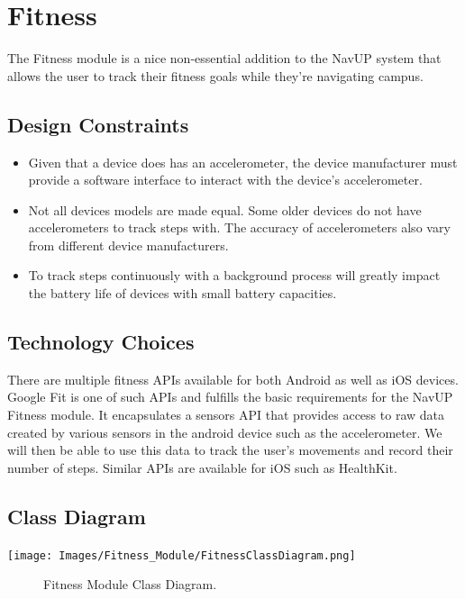 \documentclass[a4paper, 12pt, one column]{article}
\begin{document}
        
\section{Fitness}
The Fitness module is a nice non-essential addition to the NavUP system that allows the user to track their fitness goals while they're navigating campus. 

\subsection{Design Constraints}
\begin{itemize}

      \item Given that a device does has an accelerometer, the device manufacturer must provide a software interface to interact with the device's accelerometer.
      \item Not all devices models are made equal. Some older devices do not have accelerometers to track steps with. The accuracy of accelerometers also vary from different device manufacturers.
      \item To track steps continuously with a background process will greatly impact the battery life of devices with small battery capacities.
      
\end{itemize}


\subsection{Technology Choices}
There are multiple fitness APIs available for both Android as well as iOS devices. Google Fit is one of such APIs and fulfills the basic requirements for the NavUP Fitness module. It encapsulates a sensors API that provides access to raw data created by various sensors in the android device such as the accelerometer. We will then be able to use this data to track the user's movements and record their number of steps. Similar APIs are available for iOS such as HealthKit.


\subsection{Class Diagram}
        \texttt{[image: Images/Fitness\_Module/FitnessClassDiagram.png]}
        \begin{figure}[h]
            \caption{Fitness Module Class Diagram.}
        \end{figure}
        
\end{document}
